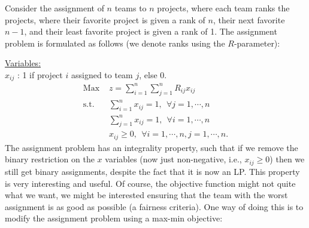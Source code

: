  Consider the assignment of $n$ teams to $n$ projects, where each team ranks the projects, where their favorite project is given a rank of $n$, their next favorite $n-1$, and their least favorite project is given a rank of 1.  The assignment problem is formulated as follows (we denote ranks using the $R$-parameter):

\smallskip \underline{Variables:} \\
$x_{ij}$ : 1 if project $i$ assigned to team $j$, else 0.
\begin{align*}
\mbox{Max~}   & z = \sum_{i=1}^{n}\sum_{j=1}^{n} R_{ij} x_{ij}  \\
\mbox{s.t.~}& \sum_{i=1}^{n} x_{ij} = 1,~~ \forall j = 1,\cdots,n  \\
& \sum_{j=1}^{n} x_{ij} = 1,~~ \forall i = 1,\cdots,n  \\
& x_{ij} \ge 0,~~ \forall i = 1,\cdots,n, j = 1,\cdots,n. 
\end{align*}
The assignment problem has an integrality property, such that if we remove the binary restriction on the $x$ variables (now just non-negative, i.e., $x_{ij} \ge 0$) then we still get binary assignments, despite the fact that it is now an LP.  This property is very interesting and useful. Of course, the objective function might not quite what we want, we might be interested ensuring that the team with the worst assignment is as good as possible (a fairness criteria). One way of doing this is to modify the assignment problem using a max-min objective:

